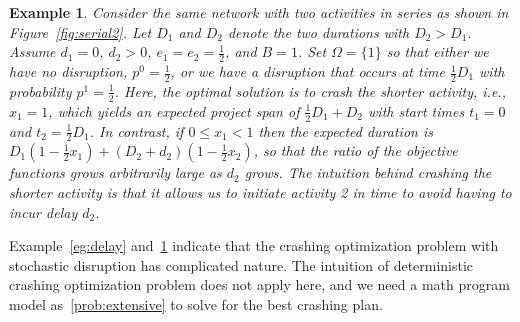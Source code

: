 \documentclass[11pt]{article}
\newtheorem{example}{Example}
\newcommand{\noi}{\noindent}
\begin{document}
	\begin{example} \label{eg:short}
		Consider the same network with two activities in series as shown in Figure~\ref{fig:serial2}. Let $D_1$ and $D_2$ denote the two durations with $D_2 > D_1$. Assume $d_1=0$, $d_2 > 0$, $e_1=e_2=\frac{1}{2}$, and $B=1$. Set $\Omega=\{1\}$ so that either we have no disruption, $p^0=\frac{1}{2}$, or we have a disruption that occurs at time $\frac{1}{2}D_1$ with probability $p^1=\frac{1}{2}$. Here, the optimal solution is to crash the shorter activity, i.e., $x_1=1$, which yields an expected project span of $\frac{1}{2}D_1 + D_2$ with start times $t_1=0$ and $t_2=\frac{1}{2}D_1$. In contrast, if $0 \le x_1 < 1$ then the expected duration is $D_1 (1-\frac{1}{2} x_1) + (D_2 + d_2)(1-\frac{1}{2} x_2)$, so that the ratio of the objective functions grows arbitrarily large as $d_2$ grows. The intuition behind crashing the shorter activity is that it allows us to initiate activity 2 in time to avoid having to incur delay $d_2$.
	\end{example}

	\noi Example~\ref{eg:delay} and~\ref{eg:short} indicate that the crashing optimization problem with stochastic disruption has complicated nature. The intuition of deterministic crashing optimization problem does not apply here, and we need a math program model as~\eqref{prob:extensive} to solve for the best crashing plan.
	
\end{document}
